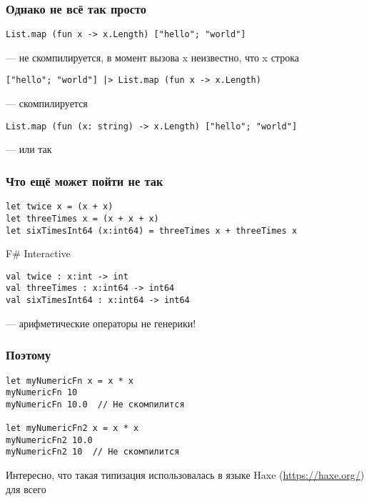 \documentclass{../../slides-style}
\begin{document}
    \begin{frame}[fragile]
        \frametitle{Однако не всё так просто}
        \begin{verbatim}
List.map (fun x -> x.Length) ["hello"; "world"]
        \end{verbatim}
        --- не скомпилируется, в момент вызова x неизвестно, что x строка
        \vspace{1cm}
        \begin{verbatim}
["hello"; "world"] |> List.map (fun x -> x.Length)  
        \end{verbatim}
        --- скомпилируется
        \vspace{1cm}
        \begin{verbatim}
List.map (fun (x: string) -> x.Length) ["hello"; "world"] 
        \end{verbatim}
        --- или так
    \end{frame}

    \begin{frame}[fragile]
        \frametitle{Что ещё может пойти не так}
        \begin{verbatim}
let twice x = (x + x)
let threeTimes x = (x + x + x)
let sixTimesInt64 (x:int64) = threeTimes x + threeTimes x
        \end{verbatim}
        \vspace{1cm}
        \begin{alertblock}{F\# Interactive}
            \begin{verbatim}
val twice : x:int -> int
val threeTimes : x:int64 -> int64
val sixTimesInt64 : x:int64 -> int64
            \end{verbatim}
        \end{alertblock}
        --- арифметические операторы не генерики!
    \end{frame}

    \begin{frame}[fragile]
        \frametitle{Поэтому}
        \begin{verbatim}
let myNumericFn x = x * x
myNumericFn 10
myNumericFn 10.0  // Не скомпилится

let myNumericFn2 x = x * x
myNumericFn2 10.0
myNumericFn2 10  // Не скомпилится
        \end{verbatim}
        \vspace{1cm}
        Интересно, что такая типизация использовалась в языке Haxe (\url{https://haxe.org/}) для всего
    \end{frame}
\end{document}
